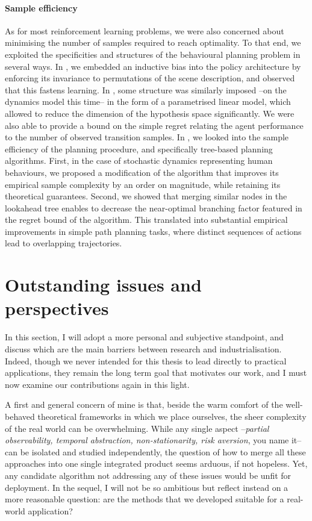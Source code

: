 \paragraph{Sample efficiency}
As for most reinforcement learning problems, we were also concerned about minimising the number of samples required to reach optimality. To that end, we exploited the specificities and structures of the behavioural planning problem in several ways. In , we embedded an inductive bias into the policy architecture by enforcing its invariance to permutations of the scene description, and observed that this fastens learning. In , some structure was similarly imposed --on the dynamics model this time-- in the form of a parametrised linear model, which allowed to reduce the dimension of the hypothesis space significantly. We were also able to provide a bound on the simple regret relating the agent performance to the number of observed transition samples. In , we looked into the sample efficiency of the planning procedure, and specifically tree-based planning algorithms. First, in the case of stochastic dynamics representing human behaviours, we proposed a modification of the \OLOP algorithm that improves its empirical sample complexity by an order on magnitude, while retaining its theoretical guarantees. Second, we showed that merging similar nodes in the lookahead tree enables to decrease the near-optimal branching factor featured in the regret bound of the algorithm. This translated into substantial empirical improvements in simple path planning tasks, where distinct sequences of actions lead to overlapping trajectories.


\section{Outstanding issues and perspectives}

In this section, I will adopt a more personal and subjective standpoint, and discuss which are the main barriers between research and industrialisation. Indeed, though we never intended for this thesis to lead directly to practical applications, they remain the long term goal that motivates our work, and I must now examine our contributions again in this light.

A first and general concern of mine is that, beside the warm comfort of the well-behaved theoretical frameworks in which we place ourselves, the sheer complexity of the real world can be overwhelming. While any single aspect --\emph{partial observability, temporal abstraction, non-stationarity, risk aversion}, you name it-- can be isolated and studied independently, the question of how to merge all these approaches into one single integrated product seems arduous, if not hopeless. Yet, any candidate algorithm not addressing any of these issues would be unfit for deployment.
In the sequel, I will not be so ambitious but reflect instead on a more reasonable question: are the methods that we developed suitable for a real-world application?

